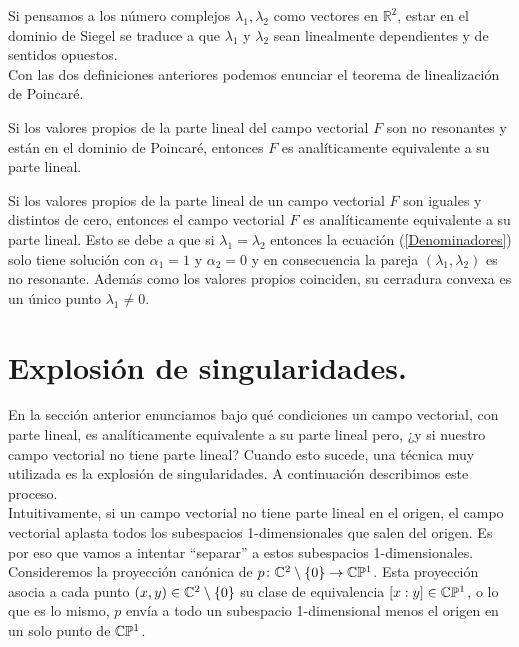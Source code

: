 Si pensamos a los número complejos $\lambda_{1},\lambda_{2}$ como vectores en $\mathbb{R}^{2}$, estar en el dominio de Siegel se traduce a que $\lambda_{1}$ y $\lambda_{2}$ sean linealmente dependientes y de sentidos opuestos.\\

Con las dos definiciones anteriores podemos enunciar el teorema de linealización de Poincaré.
\begin{Teorema}
Si los valores propios de la parte lineal del campo vectorial $F$ son no resonantes y están en el dominio de Poincaré, entonces $F$ es analíticamente equivalente a su parte lineal.
\end{Teorema}

\begin{Ejemplo}
\label{Ej:LinealizacionRadial}
Si los valores propios de la parte lineal de un campo vectorial $F$ son iguales y distintos de cero, entonces el campo vectorial $F$ es analíticamente equivalente a su parte lineal. Esto se debe a que si $\lambda_{1}=\lambda_{2}$ entonces la ecuación (\ref{Denominadores}) solo tiene solución con $\alpha_{1}=1$ y $\alpha_{2}=0$ y en consecuencia la pareja $(\lambda_{1},\lambda_{2})$ es no resonante. Además como los valores propios coinciden, su cerradura convexa es un único punto $\lambda_{1}\neq 0$. 
\end{Ejemplo}

\section{Explosión de singularidades.}  

En la sección anterior enunciamos bajo qué condiciones un campo vectorial, con parte lineal, es analíticamente equivalente a su parte lineal pero, ¿y si nuestro campo vectorial no tiene parte lineal? Cuando esto sucede, una técnica muy utilizada es la explosión de singularidades. A continuación describimos este proceso.\\

Intuitivamente, si un campo vectorial no tiene parte lineal en el origen, el campo vectorial aplasta todos los subespacios 1-dimensionales que salen del origen. Es por eso que vamos a intentar ``separar'' a estos subespacios 1-dimensionales.\\

Consideremos la proyección canónica de $p\colon\mathbb{C}^{2}\setminus\{0\}\rightarrow\mathbb{C}\mathbb{P}^{1}$. Esta proyección asocia a cada punto $(x,y)\in\mathbb{C}^{2}\setminus\{0\}$ su clase de equivalencia $[x:y]\in\mathbb{C}\mathbb{P}^{1}$, o lo que es lo mismo, $p$ envía a todo un subespacio 1-dimensional menos el origen en un solo punto de $\mathbb{C}\mathbb{P}^{1}$.\\

